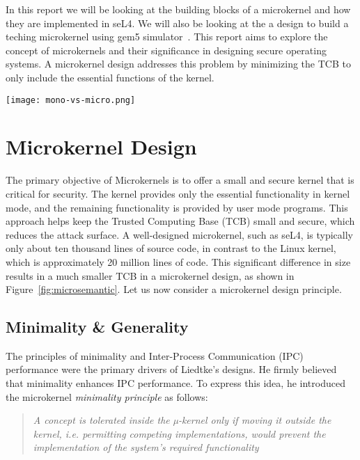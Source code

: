 \documentclass[
	a4paper, %
	11pt, %
	unnumberedsections, %
	twoside, %
]{LTJournalArticle}
\begin{document}
In this report we will be looking at the building blocks of a microkernel and how they are implemented in seL4. We will also be looking at the a design to build a teching microkernel using gem5 simulator~\cite{gem5}. This report aims to explore the concept of microkernels and their significance in designing secure operating systems. A microkernel design addresses this problem by minimizing the TCB to only include the essential functions of the kernel. 

\begin{figure*} %
	\texttt{[image: mono-vs-micro.png]}
	\caption{To left is a monolithic structure and microkernel structure on right~\cite{Heiser:2020}}
	\label{fig:microsemantic}
\end{figure*}

\newpage

\section{Microkernel Design}

The primary objective of Microkernels is to offer a small and secure kernel that is critical for security. The kernel provides only the essential functionality in kernel mode, and the remaining functionality is provided by user mode programs. This approach helps keep the Trusted Computing Base (TCB) small and secure, which reduces the attack surface. A well-designed microkernel, such as seL4, is typically only about ten thousand lines of source code, in contrast to the Linux kernel, which is approximately 20 million lines of code. This significant difference in size results in a much smaller TCB in a microkernel design, as shown in Figure~\ref{fig:microsemantic}. Let us now consider a microkernel design principle.

\subsection{Minimality \& Generality}

The principles of minimality and Inter-Process Communication (IPC) performance were the primary drivers of Liedtke's designs. He firmly believed that minimality enhances IPC performance. To express this idea, he introduced the microkernel \textit{minimality principle} as follows:~\cite{Liedtke:1995}

\begin{quote}
\textit{A concept is tolerated inside the µ-kernel only if moving it outside the kernel, i.e. permitting competing implementations, would prevent the implementation of the system's required functionality}
\end{quote}
\end{document}
